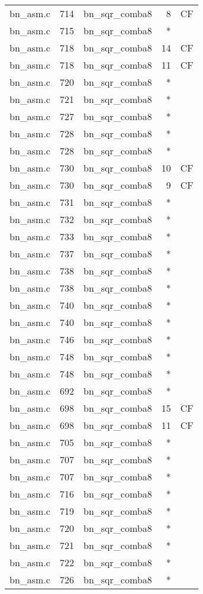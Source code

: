 \begin{table}
\begin{tabular}{clrrr}
bn\_asm.c& 714&bn\_sqr\_comba8&8 &CF\\
bn\_asm.c& 715&bn\_sqr\_comba8&*&\\
bn\_asm.c& 718&bn\_sqr\_comba8&14&CF\\
bn\_asm.c& 718&bn\_sqr\_comba8&11&CF\\
bn\_asm.c& 720&bn\_sqr\_comba8&*&\\
bn\_asm.c& 721&bn\_sqr\_comba8&*&\\
bn\_asm.c& 727&bn\_sqr\_comba8&*&\\
bn\_asm.c& 728&bn\_sqr\_comba8&*&\\
bn\_asm.c& 728&bn\_sqr\_comba8&*&\\
bn\_asm.c& 730&bn\_sqr\_comba8&10&CF\\
bn\_asm.c& 730&bn\_sqr\_comba8&9 &CF\\
bn\_asm.c& 731&bn\_sqr\_comba8&*&\\
bn\_asm.c& 732&bn\_sqr\_comba8&*&\\
bn\_asm.c& 733&bn\_sqr\_comba8&*&\\
bn\_asm.c& 737&bn\_sqr\_comba8&*&\\
bn\_asm.c& 738&bn\_sqr\_comba8&*&\\
bn\_asm.c& 738&bn\_sqr\_comba8&*&\\
bn\_asm.c& 740&bn\_sqr\_comba8&*&\\
bn\_asm.c& 740&bn\_sqr\_comba8&*&\\
bn\_asm.c& 746&bn\_sqr\_comba8&*&\\
bn\_asm.c& 748&bn\_sqr\_comba8&*&\\
bn\_asm.c& 748&bn\_sqr\_comba8&*&\\
bn\_asm.c& 692&bn\_sqr\_comba8&*&\\
bn\_asm.c& 698&bn\_sqr\_comba8&15&CF\\
bn\_asm.c& 698&bn\_sqr\_comba8&11&CF\\
bn\_asm.c& 705&bn\_sqr\_comba8&*&\\
bn\_asm.c& 707&bn\_sqr\_comba8&*&\\
bn\_asm.c& 707&bn\_sqr\_comba8&*&\\
bn\_asm.c& 716&bn\_sqr\_comba8&*&\\
bn\_asm.c& 719&bn\_sqr\_comba8&*&\\
bn\_asm.c& 720&bn\_sqr\_comba8&*&\\
bn\_asm.c& 721&bn\_sqr\_comba8&*&\\
bn\_asm.c& 722&bn\_sqr\_comba8&*&\\
bn\_asm.c& 726&bn\_sqr\_comba8&*&\\

\end{tabular}
\end{table}

